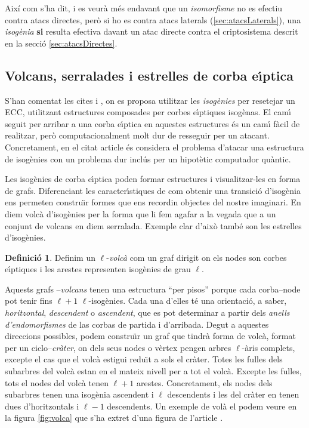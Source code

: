 \documentclass[12pt,twoside,catalan,a4paper]{book}%
\numberwithin{figure}{section}		%
\theoremstyle{definition}   			%
\newtheorem{defi}{Definici\'o}[chapter]%
\def\ce{corba e\lgem{}\'{\i}ptica}%
\def\ces{corbes e\lgem{}\'{\i}ptiques}%
\theoremstyle{saltolinea}   			%
\begin{document}
Aix\'i com s'ha dit, i es veur\`a m\'es endavant que un \emph{isomorfisme} no es efectiu contra atacs directes, per\`o si ho es contra atacs laterals (\ref{sec:atacsLaterals}), una \emph{isog\`enia} {\bf si} resulta efectiva davant un atac directe contra el criptosistema descrit en la secci\'o \ref{sec:atacsDirectes}.

\subsection{Volcans, serralades i estrelles de \ce}\label{subsec:volcans}

S'han comentat les cites \cite{PkIso} i \cite{isoTFC}, on es proposa utilitzar les \emph{isog\`enies} per resetejar un ECC, utilitzant estructures composades per \ces{} isog\`enas. El cam\'{\i} seguit per arribar a una \ce{} en aquestes estructures \'es un cam\'{\i} f\`acil de realitzar, per\`o computacionalment molt dur de resseguir per un atacant. Concretament, en el citat article \cite{PkIso} \'es considera el problema d'atacar una estructura de isog\`enies con un problema dur incl\'us per un hipot\`etic computador qu\`antic.

Les isog\`enies de \ce{} poden formar estructures i visualitzar-les en forma de grafs. Diferenciant les caracter\'{\i}stiques de com obtenir una transici\'o d'isog\`enia ens permeten constru\"{\i}r formes que ens recordin objectes del nostre imaginari. En diem volc\`a d'isog\`enies per la forma que li fem agafar a la vegada que a un conjunt de volcans en diem serralada. Exemple clar d'aix\`o tamb\' e son les estrelles d'isog\`enies.

\begin{defi}\label{def:volca} Definim un $\ell$-\emph{volc\`a} com un graf dirigit on els nodes son \ces{} i les arestes representen isog\`enies de grau $\ell$.\end{defi}
Aquests grafs --\/\emph{volcans} tenen una estructura ``per pisos'' porque cada corba--node pot tenir fins $\ell+1$ $\ell$\/-isog\`enies. Cada una d'elles t\'e una orientaci\'o, a saber, \emph{horitzontal}, \emph{descendent} o \emph{ascendent}, que es pot determinar a partir dels \emph{anells d'endomorfismes} de las corbas de partida i d'arribada. Degut a aquestes direccions possibles, podem constru\"{\i}r un graf que tindr\`a forma de volc\`a, format per un ciclo--\/\emph{cr\`ater}, on dels seus nodes o v\`ertex pengen arbres $\ell$-\/\`aris complets, excepte el cas que el volc\`a estigui redu\"{\i}t a sols el cr\`ater. Totes les fulles dels subarbres del volc\`a estan en el mateix nivell per a tot el volc\`a. Excepte les fulles, tots el nodes del volc\`a tenen $\ell+1$ arestes. Concretament, els nodes dels subarbres tenen una isog\`enia ascendent i $\ell$ descendents i les del cr\`ater en tenen dues d'horitzontals i $\ell-1$ descendents. Un exemple de vol\`a el podem veure en la figura \ref{fig:volca} que s'ha extret d'una figura de l'article \cite{VolcanIso}.
\end{document}
